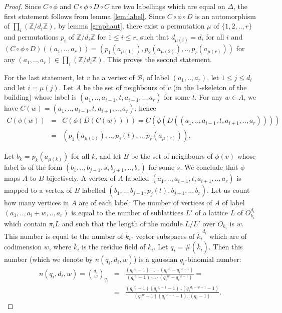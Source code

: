 \documentclass{amsart}
\theoremstyle{theorem}
\theoremstyle{lemma}
\theoremstyle{prop}
\theoremstyle{definition}
\theoremstyle{corollary}
\theoremstyle{remark}
\newcommand{\Z}{\mathbb{Z}}
\newcommand{\B}{\mathcal{B}}
\begin{document}
\begin{proof}

Since $C \circ \phi$ and $C \circ \phi \circ D \circ C$ are two labellings which are equal on $\Delta$, the first statement follows from lemma \ref{lem:label}. Since $C\circ \phi \circ D$ is an automorphism of $\prod_i(\Z/d_i\Z)$, by lemma \ref{graphaut}, there exist a permutation $\mu$ of $\{1,2,..,r\}$ and permutations $p_i$ of $\Z/d_i\Z$ for $1\leq i \leq r$, such that $d_{\mu(i)}=d_i$ for all $i$ and $(C \circ \phi \circ D)((a_1,..,a_r))=(p_1(a_{\mu(1)}),p_2(a_{\mu(2)}),..,p_r(a_{\mu(r)}))$ for any $(a_1,..,a_r) \in \prod_i(\Z/d_i\Z)$. This proves the second statement.

For the last statement, let $v$ be a vertex of $\B$, of label $(a_1,..,a_r)$, let $1\leq j \leq d_i$ and let $i=\mu(j)$. Let $A$ be the set of neighbours of $v$ (in the 1-skeleton of the building) whose label is $(a_1,..,a_{i-1},t,a_{i+1},..,a_r)$ for some $t$. For any $w\in A$, we have $C(w)=(a_1,..,a_{i-1},t,a_{i+1},..,a_r)$, hence \begin{eqnarray*} 
C(\phi(w))&=&C(\phi(D(C(w))))=C(\phi(D((a_1,..,a_{i-1},t,a_{i+1},..,a_r))))\\ &=&(p_1(a_{\mu(1)}),..,p_j(t),..,p_r(a_{\mu(r)})),\end{eqnarray*} 

Let $b_k=p_k(a_{\mu(k)})$ for all $k$, and let $B$ be the set of neighbours of $\phi(v)$ whose label is of the form $(b_1,..,b_{j-1},s,b_{j+1},..,b_r)$ for some $s$. We conclude that $\phi$ maps $A$ to $B$ bijectively. A vertex of $A$ labelled $(a_1,..,a_{i-1},t,a_{i+1},..,a_r)$ is mapped to a vertex of $B$ labelled $(b_1,..,b_{j-1},p_j(t),b_{j+1},..,b_r)$. 
Let us count how many vertices in $A$ are of each label: The number of vertices of $A$ of label $(a_1,..,a_i+w,..,a_r)$ is equal to the number of sublattices $L'$ of a lattice $L$ of $O_{k_i}^{d_i}$ which contain $\pi_i L$ and such that the length of the module $L/L'$ over $O_{k_i}$ is $w$. This number is equal to the number of  $\tilde{k_i}$- vector subspaces of $\tilde{k_i}^{d_i}$ which are of codimension $w$, where $\tilde{k_i}$ is the residue field of $k_i$. Let $q_i=\#(\tilde{k_i})$. Then this number (which we denote by $n(q_i,d_i,w)$) is a gaussian $q_i$-binomial number:
 \begin{eqnarray*} n(q_i,d_i,w) = \binom{d_i}{w}_{q_i} &=& \frac{ ({q_i}^{d_i}-1)\cdot... \cdot ({q_i}^{d_i}-{q_i}^{w-1})}{({q_i}^w-1)\cdot .. \cdot ({q_i}^w-{q_i}^{w-1})} = \\
 &=& \frac{({q_i}^{d_i}-1)({q_i}^{{d_i}-1}-1)..({q_i}^{d_i-w+1}-1)}{({q_i}^w-1)({q_i}^{w-1}-1)..({q_i}-1)}.\end{eqnarray*}


\end{proof}
\end{document}
